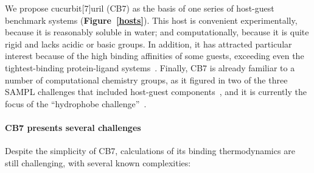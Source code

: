 \documentclass[aps,pre,twocolumn,nofootinbib,superscriptaddress,10pt, final,tightenlines]{revtex4-1}
\begin{document}
We propose cucurbit[7]uril (CB7) as the basis of one series of host-guest benchmark systems ({\bf Figure~\ref{hosts}}). 
This host is convenient experimentally, because it is reasonably soluble in water; and computationally, because it is quite rigid and lacks acidic or basic groups. 
In addition, it has attracted particular interest because of the high binding affinities of some guests, exceeding even the tightest-binding protein-ligand systems~\cite{liu_cucurbituril_2005, rekharsky_synthetic_2007, moghaddam_hostguest_2009, cao_attomolar_2014}.  
Finally, CB7 is already familiar to a number of computational chemistry groups, as it figured in two of the three SAMPL challenges that included host-guest components~\cite{muddana_sampl3_2012, muddana_sampl4_2014}, and it is currently the focus of the ``hydrophobe challenge''~\cite{schreiner_theoretical_2016}. 
 
\paragraph{CB7 presents several challenges} Despite the simplicity of CB7, calculations of its binding thermodynamics are still challenging, with several known complexities:
\end{document}
